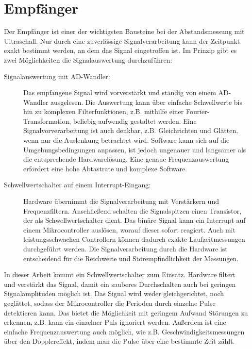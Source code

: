 


\chapter{Empfänger}
Der Empfänger ist einer der wichtigsten Bausteine bei der Abstandsmessung mit Ultraschall. Nur durch eine zuverlässige Signalverarbeitung kann der Zeitpunkt exakt bestimmt werden, an dem das Signal eingetroffen ist. Im Prinzip gibt es zwei Möglichkeiten die Signalauswertung durchzuführen:
\begin{description} %
	\item[Signalauswertung mit AD-Wandler:] Das empfangene Signal wird vorverstärkt und ständig von einem AD-Wandler ausgelesen. Die Auswertung kann über einfache Schwellwerte bis hin zu komplexen Filterfunktionen, z.B. mithilfe einer Fourier-Transformation, beliebig aufwendig gestaltet werden. Eine Signalvorverarbeitung ist auch denkbar, z.B. Gleichrichten und Glätten, wenn nur die Auslenkung betrachtet wird. Software kann sich auf die Umgebungsbedingungen anpassen, ist jedoch ungenauer und langsamer als die entsprechende Hardwarelösung. Eine genaue Frequenzauswertung erfordert eine hohe Abtastrate und komplexe Software.
	\item[Schwellwertschalter auf einem Interrupt-Eingang:] Hardware übernimmt die Signalverarbeitung mit Verstärkern und Frequenzfiltern. Anschließend schalten die Signalspitzen einen Transistor, der als Schwellwertschalter dient. Das binäre Signal kann ein Interrupt auf einem Mikrocontroller auslösen, worauf dieser sofort reagiert. Auch mit leistungsschwachen Controllern können dadurch exakte Laufzeitmessungen durchgeführt werden. Die Signalverarbeitung durch die Hardware ist entscheidend für die Reichweite und Störempfindlichkeit der Messungen.
\end{description}

In dieser Arbeit kommt ein Schwellwertschalter zum Einsatz. Hardware filtert und verstärkt das Signal, damit ein sauberes Durchschalten auch bei geringen Signalamplituden möglich ist. Das Signal wird weder gleichgerichtet, noch geglättet, sodass der Mikrocontroller die Perioden durch einzelne Pulse detektieren kann. Das bietet die Möglichkeit mit geringem Aufwand Störungen zu erkennen, z.B. kann ein einzelner Puls ignoriert werden. Außerdem ist eine einfache Frequenzauswertung auch möglich, wie z.B. Geschwindigkeitsmessungen über den Dopplereffekt, indem man die Pulse über eine bestimmte Zeit zählt.\\


